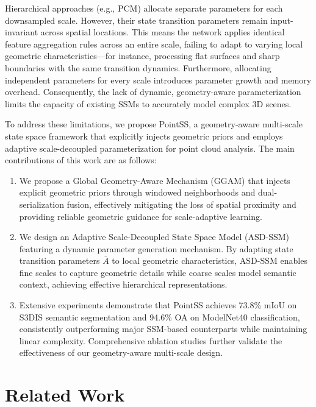 \documentclass[letterpaper,journal]{IEEEtran}
\begin{document}
Hierarchical approaches (e.g., PCM) allocate separate parameters for each downsampled scale. However, their state transition parameters remain input-invariant across spatial locations. This means the network applies identical feature aggregation rules across an entire scale, failing to adapt to varying local geometric characteristics---for instance, processing flat surfaces and sharp boundaries with the same transition dynamics. Furthermore, allocating independent parameters for every scale introduces parameter growth and memory overhead. Consequently, the lack of dynamic, geometry-aware parameterization limits the capacity of existing SSMs to accurately model complex 3D scenes.


To address these limitations, we propose PointSS, a geometry-aware
multi-scale state space framework that explicitly injects geometric
priors and employs adaptive scale-decoupled parameterization for point cloud
analysis. The main contributions of this work are as follows:

  \begin{enumerate}
	\item We propose a Global Geometry-Aware Mechanism (GGAM) that injects
	explicit geometric priors through windowed neighborhoods and dual-
	serialization fusion, effectively mitigating the loss of spatial proximity
	and providing reliable geometric guidance for scale-adaptive learning.
	
	\item We design an Adaptive Scale-Decoupled State Space Model (ASD-SSM)
	featuring a dynamic parameter generation mechanism. By adapting state
	transition parameters $\bar{A}$ to local geometric characteristics, ASD-SSM
	enables fine scales to capture geometric details while coarse scales model
	semantic context, achieving effective hierarchical representations.
	
	\item Extensive experiments demonstrate that PointSS achieves 73.8\% mIoU
	on S3DIS semantic segmentation and 94.6\% OA on ModelNet40 classification,
	consistently outperforming major SSM-based counterparts while maintaining linear complexity.
	Comprehensive ablation studies further validate the effectiveness of our
	geometry-aware multi-scale design.
\end{enumerate}



\section{Related Work}
\end{document}
